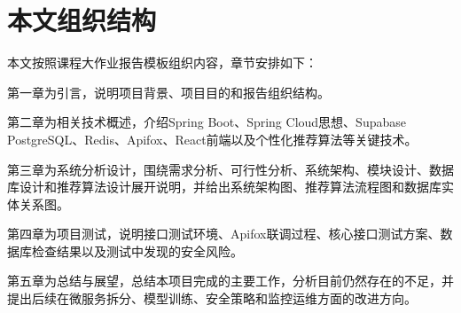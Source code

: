 \section{本文组织结构}

本文按照课程大作业报告模板组织内容，章节安排如下：

第一章为引言，说明项目背景、项目目的和报告组织结构。

第二章为相关技术概述，介绍Spring Boot、Spring Cloud思想、Supabase PostgreSQL、Redis、Apifox、React前端以及个性化推荐算法等关键技术。

第三章为系统分析设计，围绕需求分析、可行性分析、系统架构、模块设计、数据库设计和推荐算法设计展开说明，并给出系统架构图、推荐算法流程图和数据库实体关系图。

第四章为项目测试，说明接口测试环境、Apifox联调过程、核心接口测试方案、数据库检查结果以及测试中发现的安全风险。

第五章为总结与展望，总结本项目完成的主要工作，分析目前仍然存在的不足，并提出后续在微服务拆分、模型训练、安全策略和监控运维方面的改进方向。
